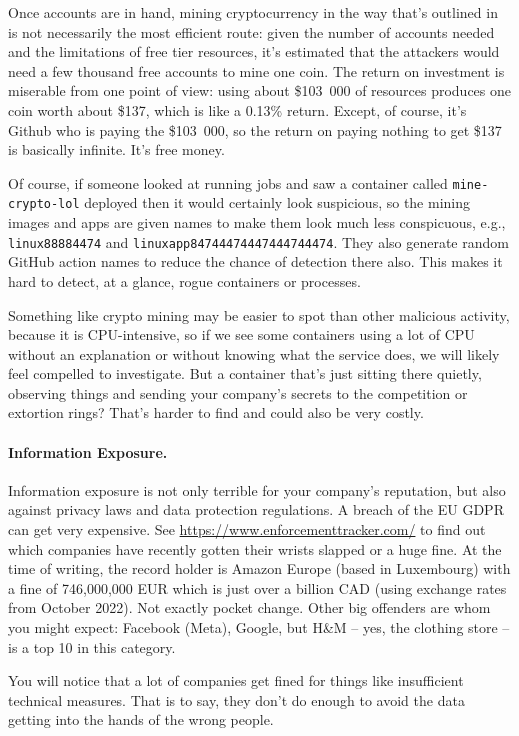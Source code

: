 \documentclass[a4paper]{report}
\begin{document}
Once accounts are in hand, mining cryptocurrency in the way that's outlined in~\cite{sysdig} is not necessarily the most efficient route: given the number of accounts needed and the limitations of free tier resources, it's estimated that the attackers would need a few thousand free accounts to mine one coin. The return on investment is miserable from one point of view: using about \$103~000 of resources produces one coin worth about \$137, which is like a 0.13\% return. Except, of course, it's Github who is paying the \$103~000, so the return on paying nothing to get \$137 is basically infinite. It's free money.

Of course, if someone looked at running jobs and saw a container called \texttt{mine-crypto-lol} deployed then it would certainly look suspicious, so the mining images and apps are given names to make them look much less conspicuous, e.g., \texttt{linux88884474} and \texttt{linuxapp84744474447444744474}. They also generate random GitHub action names to reduce the chance of detection there also. This makes it hard to detect, at a glance, rogue containers or processes. 

Something like crypto mining may be easier to spot than other malicious activity, because it is CPU-intensive, so if we see some containers using a lot of CPU without an explanation or without knowing what the service does, we will likely feel compelled to investigate. But a container that's just sitting there quietly, observing things and sending your company's secrets to the competition or extortion rings? That's harder to find and could also be very costly.

\paragraph{Information Exposure.}
Information exposure is not only terrible for your company's reputation, but also against privacy laws and data protection regulations. A breach of the EU GDPR can get very expensive. See \url{https://www.enforcementtracker.com/} to find out which companies have recently gotten their wrists slapped or a huge fine. At the time of writing, the record holder is Amazon Europe (based in Luxembourg) with a fine of 	746,000,000 EUR which is just over a billion CAD (using exchange rates from October 2022). Not exactly pocket change. Other big offenders are whom you might expect: Facebook (Meta), Google, but H\&M -- yes, the clothing store -- is a top 10 in this category.

You will notice that a lot of companies get fined for things like insufficient technical measures. That is to say, they don't do enough to avoid the data getting into the hands of the wrong people.
\end{document}

